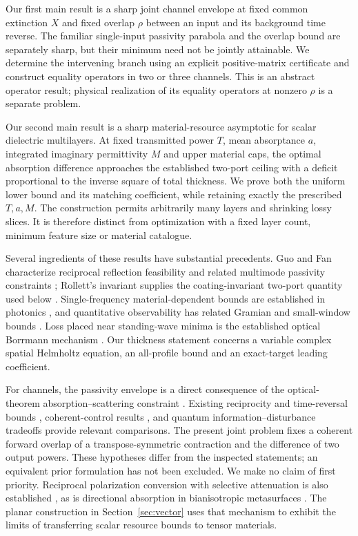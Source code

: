 \documentclass[11pt,a4paper]{article}
\theoremstyle{remark}
\begin{document}
Our first main result is a sharp joint channel envelope at fixed common extinction $X$ and fixed overlap $\rho$ between an input and its background time reverse. The familiar single-input passivity parabola and the overlap bound are separately sharp, but their minimum need not be jointly attainable. We determine the intervening branch using an explicit positive-matrix certificate and construct equality operators in two or three channels. This is an abstract operator result; physical realization of its equality operators at nonzero $\rho$ is a separate problem.

Our second main result is a sharp material-resource asymptotic for scalar dielectric multilayers. At fixed transmitted power $T$, mean absorptance $a$, integrated imaginary permittivity $M$ and upper material caps, the optimal absorption difference approaches the established two-port ceiling with a deficit proportional to the inverse square of total thickness. We prove both the uniform lower bound and its matching coefficient, while retaining exactly the prescribed $T,a,M$. The construction permits arbitrarily many layers and shrinking lossy slices. It is therefore distinct from optimization with a fixed layer count, minimum feature size or material catalogue.

Several ingredients of these results have substantial precedents. Guo and Fan characterize reciprocal reflection feasibility and related multimode passivity constraints \citep{GuoFan2022,GuoFan2024}; Rollett's invariant supplies the coating-invariant two-port quantity used below \citep{Rollett1962}. Single-frequency material-dependent bounds are established in photonics \citep{Kuang2020}, and quantitative observability has related Gramian and small-window bounds \citep{Chitour2010,Hante2012,Privat2013}. Loss placed near standing-wave minima is the established optical Borrmann mechanism \citep{Kozhevnikov2008,Barreaux2017}. Our thickness statement concerns a variable complex spatial Helmholtz equation, an all-profile bound and an exact-target leading coefficient.

For channels, the passivity envelope is a direct consequence of the optical-theorem absorption--scattering constraint \citep{Fleury2014}. Existing reciprocity and time-reversal bounds \citep{SounasAlu2017,Ma2025}, coherent-control results \citep{Li2025}, and quantum information--disturbance tradeoffs \citep{Buscemi2006,Dariano2009} provide relevant comparisons. The present joint problem fixes a coherent forward overlap of a transpose-symmetric contraction and the difference of two output powers. These hypotheses differ from the inspected statements; an equivalent prior formulation has not been excluded. We make no claim of first priority. Reciprocal polarization conversion with selective attenuation is also established \citep{Armitage2014,Potton2004,Khurgin2021}, as is directional absorption in bianisotropic metasurfaces \citep{ManezEspina2026}. The planar construction in Section~\ref{sec:vector} uses that mechanism to exhibit the limits of transferring scalar resource bounds to tensor materials.
\end{document}
